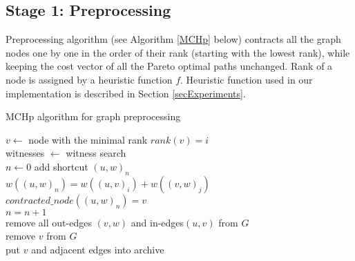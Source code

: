 

\subsection{Stage 1: Preprocessing} \label{subsecStage1}

Preprocessing algorithm (see Algorithm \ref{MCHp} below) contracts all the
graph nodes one by one in the order of their rank (starting with the lowest
rank), while keeping the cost vector of all the Pareto optimal paths unchanged.
Rank of a node is assigned by a heuristic function $f$. Heuristic function 
used in our implementation is described in Section \ref{secExperiments}.

\vskip 5mm
\begin{algorithm}[H]
    \SetAlgoLined
    \LinesNumbered
    \caption{MCHp algorithm for graph preprocessing}
    \label{MCHp}
     {
        $v \leftarrow $ node with the minimal rank
        $rank(v) = i$ \\
        witnesses $\leftarrow$ witness search \\
        $n \leftarrow 0$  
         {
             {
                add shortcut $(u,w)_n$ \\
                $w((u,w)_n) = w((u,v)_i)+w((v,w)_j)$ \\
                $contracted\_node((u,w)_n) = v$ \\
                $n = n+1$ \\
            }
        }
        remove all out-edges $(v,w)$ and in-edges$(u,v)$ from $G$ \\
        remove $v$ from $G$ \\
        put $v$ and adjacent edges into archive 
    }
    \vskip 5mm
\end{algorithm}
\vskip 5mm


